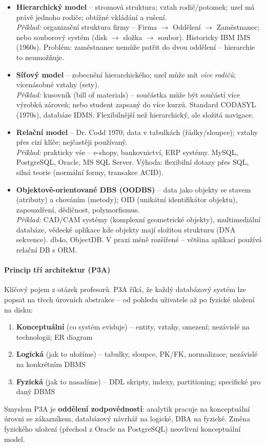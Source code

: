 \begin{itemize}
  \item \textbf{Hierarchický model} -- stromová struktura; vztah rodič/potomek; uzel má právě jednoho rodiče; obtížné vkládání a rušení. \\
    \textit{Příklad:} organizační struktura firmy -- Firma $\to$ Oddělení $\to$ Zaměstnanec; nebo souborový systém (disk $\to$ složka $\to$ soubor). Historicky IBM IMS (1960s). Problém: zaměstnanec nemůže patřit do dvou oddělení -- hierarchie to neumožňuje.

  \item \textbf{Síťový model} -- zobecnění hierarchického; uzel může mít \textit{více rodičů}; vícenásobné vztahy (sety). \\
    \textit{Příklad:} kusovník (bill of materials) -- součástka může být součástí více výrobků zároveň; nebo student zapsaný do více kurzů. Standard CODASYL (1970s), databáze IDMS. Flexibilnější než hierarchický, ale složitá navigace.

  \item \textbf{Relační model} -- Dr. Codd 1970; data v tabulkách (řádky/sloupce); vztahy přes cizí klíče; nejčastěji používaný. \\
    \textit{Příklad:} prakticky vše -- e-shopy, bankovnictví, ERP systémy. MySQL, PostgreSQL, Oracle, MS SQL Server. Výhoda: flexibilní dotazy přes SQL, silná teorie (normální formy, transakce ACID).

  \item \textbf{Objektově-orientované DBS (OODBS)} -- data jako objekty se stavem (atributy) a chováním (metody); OID (unikátní identifikátor objektu), zapouzdření, dědičnost, polymorfismus. \\
    \textit{Příklad:} CAD/CAM systémy (komplexní geometrické objekty), multimediální databáze, vědecké aplikace kde objekty mají složitou strukturu (DNA sekvence). db4o, ObjectDB. V praxi méně rozšířené -- většina aplikací používá relační DB s ORM.
\end{itemize}

\paragraph{Princip tří architektur (P3A)}
Klíčový pojem z otázek profesorů. P3A říká, že každý databázový systém lze popsat na třech úrovních abstrakce -- od pohledu uživatele až po fyzické uložení na disku:
\begin{enumerate}
  \item \textbf{Konceptuální} (co systém eviduje) -- entity, vztahy, omezení; nezávislé na technologii; ER diagram
  \item \textbf{Logická} (jak to uložíme) -- tabulky, sloupce, PK/FK, normalizace; nezávislé na konkrétním DBMS
  \item \textbf{Fyzická} (jak to nasadíme) -- DDL skripty, indexy, partitioning; specifické pro daný DBMS
\end{enumerate}
Smyslem P3A je \textbf{oddělení zodpovědností}: analytik pracuje na konceptuální úrovni se zákazníkem, databázový návrhář na logické, DBA na fyzické. Změna fyzického uložení (přechod z Oracle na PostgreSQL) neovlivní konceptuální model.

